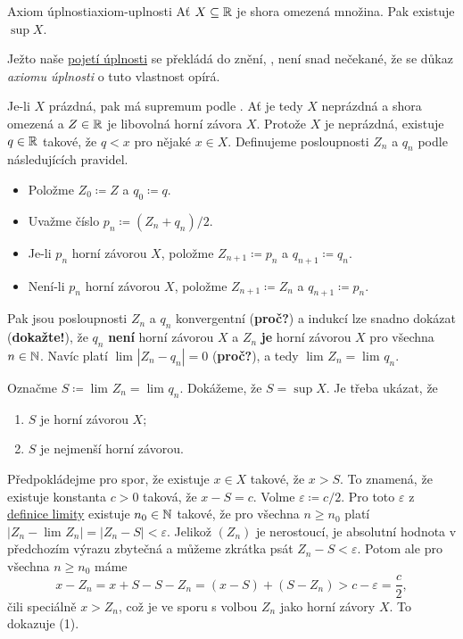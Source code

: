 \begin{proposition}{Axiom úplnosti}{axiom-uplnosti}
 Ať $X \subseteq \mathbb{R}$ je shora omezená množina. Pak existuje $\sup X$.
\end{proposition}
\begin{propproof}
 Ježto naše \hyperref[cor:r-jsou-uplna]{pojetí úplnosti} se překládá do znění,
 , není snad nečekané, že se důkaz
 \emph{axiomu úplnosti} o tuto vlastnost opírá.

 Je-li $X$ prázdná, pak má supremum podle
 . Ať je tedy $X$ neprázdná a shora
 omezená a $Z \in \mathbb{R}$ je libovolná horní závora $X$. Protože $X$ je neprázdná,
 existuje $q \in \mathbb{R}$ takové, že $q < x$ pro nějaké $x \in X$. Definujeme
 posloupnosti $Z_n$ a $q_n$ podle následujících pravidel.
 \begin{itemize}
  \item Položme $Z_0 \coloneqq Z$ a $q_0 \coloneqq q$.
  \item Uvažme číslo $p_n \coloneqq (Z_n + q_n) / 2$.
  \item Je-li $p_n$ horní závorou $X$, položme $Z_{n+1} \coloneqq p_n$ a
   $q_{n+1} \coloneqq q_n$.
  \item Není-li $p_n$ horní závorou $X$, položme $Z_{n+1} \coloneqq Z_n$ a
   $q_{n+1} \coloneqq p_n$.
 \end{itemize}
 Pak jsou posloupnosti $Z_n$ a $q_n$ konvergentní (\textbf{proč?}) a indukcí lze
 snadno dokázat (\textbf{dokažte!}), že $q_n$ \textbf{není} horní závorou $X$ a
 $Z_n$ \textbf{je} horní závorou $X$ pro všechna $n \in \mathbb{N}$. Navíc platí
 $\lim_{} |Z_n - q_n| = 0$ (\textbf{proč?}), a tedy $\lim_{} Z_n = \lim_{} q_n$.

 Označme $S \coloneqq \lim_{} Z_n = \lim_{} q_n$. Dokážeme, že $S = \sup X$. Je
 třeba ukázat, že
 \begin{enumerate}
  \item $S$ je horní závorou $X$;
  \item $S$ je nejmenší horní závorou.
 \end{enumerate}
 Předpokládejme pro spor, že existuje $x \in X$ takové, že $x > S$. To znamená,
 že existuje konstanta $c > 0$ taková, že $x - S = c$. Volme $\varepsilon
 \coloneqq c / 2$. Pro toto $\varepsilon$ z
 \hyperref[def:limita-posloupnosti]{definice limity} existuje $n_0 \in \mathbb{N}$
 takové, že pro všechna $n \geq n_0$ platí $|Z_n - \lim_{} Z_n| = |Z_n - S| <
 \varepsilon$. Jelikož $(Z_n)$ je nerostoucí, je absolutní hodnota v předchozím
 výrazu zbytečná a můžeme zkrátka psát $Z_n - S < \varepsilon$. Potom ale pro
 všechna $n \geq n_0$ máme
 \[
  x - Z_n = x + S - S - Z_n = (x - S) + (S - Z_n) > c - \varepsilon =
  \frac{c}{2},
 \]
 čili speciálně $x > Z_n$, což je ve sporu s volbou $Z_n$ jako horní závory $X$.
 To dokazuje (1).


\end{propproof}
